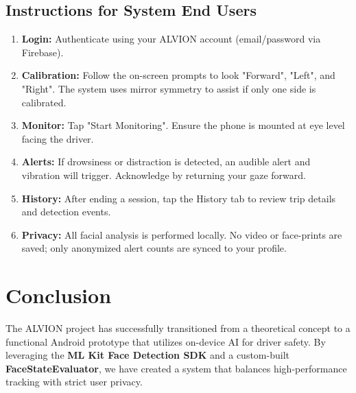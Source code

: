 \documentclass[11pt]{report}
\begin{document}
\section{Instructions for System End Users}
\begin{enumerate}
    \item \textbf{Login:} Authenticate using your ALVION account (email/password via Firebase).
    \item \textbf{Calibration:} Follow the on-screen prompts to look "Forward", "Left", and "Right". The system uses mirror symmetry to assist if only one side is calibrated.
    \item \textbf{Monitor:} Tap "Start Monitoring". Ensure the phone is mounted at eye level facing the driver.
    \item \textbf{Alerts:} If drowsiness or distraction is detected, an audible alert and vibration will trigger. Acknowledge by returning your gaze forward.
    \item \textbf{History:} After ending a session, tap the History tab to review trip details and detection events.
    \item \textbf{Privacy:} All facial analysis is performed locally. No video or face-prints are saved; only anonymized alert counts are synced to your profile.
\end{enumerate}

\clearpage

\chapter{Conclusion}
The ALVION project has successfully transitioned from a theoretical concept to a functional Android prototype that utilizes on-device AI for driver safety. By leveraging the \textbf{ML Kit Face Detection SDK} and a custom-built \textbf{FaceStateEvaluator}, we have created a system that balances high-performance tracking with strict user privacy.
\end{document}
